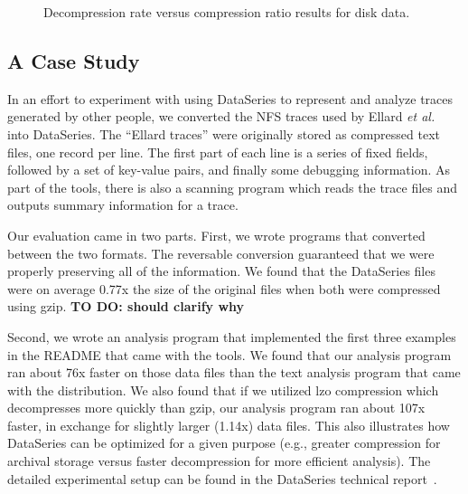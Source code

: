 \documentclass{acm_proc_article-sp}
\begin{document}
\begin{figure}[tbh]
\caption{ Decompression rate versus compression ratio results for disk data.}
\label{fig:decomRateRatios}
\end{figure}

\subsection{A Case Study}\label{sec:ellard}

In an effort to experiment with using DataSeries to represent and
analyze traces generated by other people, we converted the NFS
traces used by Ellard \textit{et al.}~\cite{ellard03} into DataSeries.  
The ``Ellard traces''
were originally stored as compressed text files, one record per line.
The first part of each line is a series of fixed fields, followed by a
set of key-value pairs, and finally some debugging information.  As
part of the tools, there is also a scanning program which reads the
trace files and outputs summary information for a trace.

Our evaluation came in two parts.  First, we wrote programs that
converted between the two formats.  The reversable conversion
guaranteed that we were properly preserving all of the information.
We found that the DataSeries files were on average 0.77x the size of
the original files when both were compressed using gzip.  
{\bf TO DO: should clarify why}

Second, we
wrote an analysis program that implemented the first three examples in
the README that came with the tools.  We found that our analysis
program ran about 76x faster on those data files than the text
analysis program that came with the distribution.  We also found that
if we utilized lzo compression which decompresses more quickly than
gzip, our analysis program ran about 107x faster, in exchange for
slightly larger (1.14x) data files.  This also illustrates how
DataSeries can be optimized for a given purpose (e.g., greater
compression for archival storage versus faster decompression for more
efficient analysis). The detailed experimental setup can be found in
the DataSeries technical report~\cite{DSTechnicalReportSnapshot}.
\end{document}
